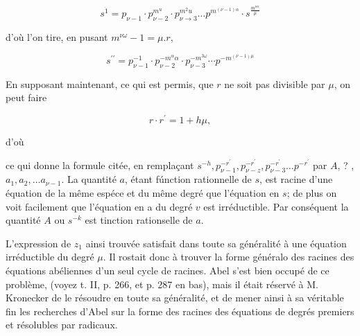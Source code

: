 \documentclass{article}
\begin{document}
\[
s^{\dot{1}}=p_{\nu-1} \cdot p_{\nu-2}^{m^{u}} \cdot p_{\nu \rightarrow 3}^{m^{2} u} \ldots p^{m^{(\nu-1) \alpha}} \cdot s^{\frac{m^{\nu \alpha}}{\mu}}
\]

d'où l'on tire, en pusant \(m^{\nu \omega}-1=\mu . r\),

\[
s^{\prime \prime}=p_{\nu-1}^{-1} \cdot p_{\nu-2}^{-m^{\alpha} \alpha} \cdot p_{\nu-3}^{-m^{3 \omega}} \cdots p^{-m^{(\nu-1) \mu}}
\]

En supposant maintenant, ce qui est permis, que \(r\) ne soit pas divisible par \(\mu\), on peut faire

\[
r \cdot r^{\prime}=1+h \mu,
\]

d'où


ce qui donne la formule citée, en remplaçant \(s^{-h}, p_{\nu-1}^{-r^{\prime}}, p_{\nu-z}^{-r^{\prime}}, p_{\nu-3}^{-r^{\prime}} \ldots p^{-r^{\prime}}\) par \(A\), ? , \(a_{1}, a_{2}, \ldots a_{\nu-1}\). La quantité \(a\), étant fúnction rationnelle de \(s\), est racine d'une équation de la même espéce et du même degré que l'équation en \(s\); de plus on voit facilement que l'équation en a du degré \(v\) est irréductible. Par conséquent la quantité \(A\) ou \(s^{-k}\) est tinction rationselle de \(a\).

L'expression de \(z_{1}\) ainsi trouvée satisfait dans toute sa généralité à une équation irréductible du degré \(\mu\). Il rostait donc à trouver la forme généralo des racines des équations abéliennes d'un seul cycle de racines. Abel s'est bien occupé de ce problème, (voyez t. II, p. 266, et p. 287 en bas), mais il était réservé à M. Kronecker de le résoudre en toute sa généralité, et de mener ainsi à sa véritable fin les recherches d'Abel sur la forme des racines des équations de degrés premiers et résolubles par radicaux.
\end{document}
